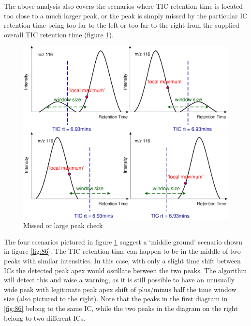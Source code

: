 The above analysis also covers the scenarios where TIC retention time is
located too close to a much larger peak, or the peak is simply missed by
the particular IC retention time being too far to the left or too far to
the right from the supplied overall TIC retention time (figure \ref{fig:85}).

\begin{figure}
  \begin{center}
    \includegraphics[scale=0.7]{graphics/chapter08/85.eps}
  \end{center}
  \caption{Missed or large peak check}
  \label{fig:85}
\end{figure}

The four scenarios pictured in figure \ref{fig:85} suggest a ‘middle 
ground’ scenario shown in figure \ref{fig:86}. The TIC retention time
can happen to be in the middle of two peaks with similar intensities.
In this case, with only a slight time shift between ICs the detected
peak apex would oscillate between the two peaks. The algorithm will
detect this and raise a warning, as it is still possible to have an
unusually wide peak with legitimate peak apex shift of plus/minus
half the time window size (also pictured to the right). Note that
the peaks in the first diagram in \ref{fig:86} belong to the same IC,
while the two peaks in the diagram on the right belong to two
different ICs.

